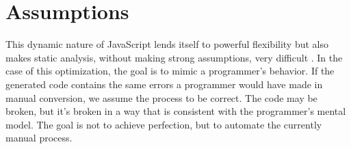 \section{Assumptions}

This dynamic nature of JavaScript lends itself to powerful flexibility but also makes static analysis, without making strong assumptions, very difficult \cite{TODO}.  In the case of this optimization, the goal is to mimic a programmer's behavior.  If the generated code contains the same errors a programmer would have made in manual conversion, we assume the process to be correct.  The code may be broken, but it's broken in a way that is consistent with the programmer's mental model.  The goal is not to achieve perfection, but to automate the currently manual process.  



